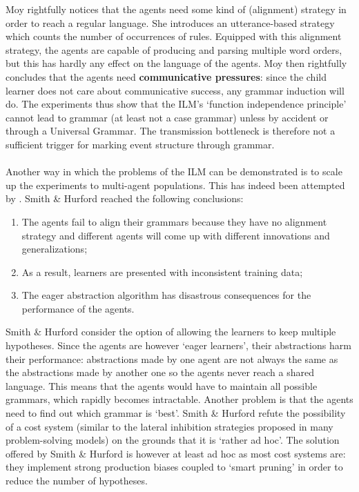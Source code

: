 Moy rightfully notices that the agents need some kind of (alignment) strategy in order to reach a regular language. She introduces an utterance-based strategy which counts the number of occurrences of rules. Equipped with this alignment strategy, the agents are capable of producing and parsing multiple word orders, but this has hardly any effect on the language of the agents. Moy then rightfully concludes that the agents need {\bfseries communicative pressures}: since the child learner does not care about communicative success, any grammar induction will do. The experiments thus show that the ILM's `function independence principle' cannot lead to grammar (at least not a case grammar) unless by accident or through a Universal Grammar. The transmission bottleneck is therefore not a sufficient trigger for marking event structure through grammar.
\\
\\
 Another way in which the problems of the ILM can be demonstrated is to scale up the experiments to multi-agent populations. This has indeed been attempted by \citet{smith03language}. Smith \& Hurford reached the following conclusions:

\begin{enumerate}
\item The agents fail to align their grammars because they have no alignment strategy and different agents will come up with different innovations and generalizations;
\item As a result, learners are presented with inconsistent training data;
\item The eager abstraction algorithm has disastrous consequences for the performance of the agents.
\end{enumerate}

Smith \& Hurford consider the option of allowing the learners to keep multiple hypotheses. Since the agents are however `eager learners', their abstractions harm their performance: abstractions made by one agent are not always the same as the abstractions made by another one so the agents never reach a shared language. This means that the agents would have to maintain all possible grammars, which rapidly becomes intractable. Another problem is that the agents need to find out which grammar is `best'. Smith \& Hurford refute the possibility of a cost system (similar to the lateral inhibition strategies proposed in many problem-solving models) on the grounds that it is `rather ad hoc'. The solution offered by Smith \& Hurford is however at least ad hoc as most cost systems are: they implement strong production biases coupled to `smart pruning' in order to reduce the number of hypotheses.

